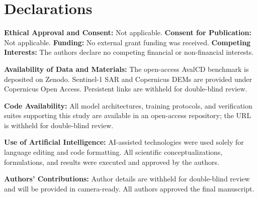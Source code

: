 \section*{Declarations}

\noindent\textbf{Ethical Approval and Consent:} Not applicable. \quad
\textbf{Consent for Publication:} Not applicable. \quad
\textbf{Funding:} No external grant funding was received. \quad
\textbf{Competing Interests:} The authors declare no competing financial or non-financial interests.

\smallskip
\noindent\textbf{Availability of Data and Materials:} The open-access AvalCD benchmark is deposited on Zenodo. Sentinel-1 SAR and Copernicus DEMs are provided under Copernicus Open Access. Persistent links are withheld for double-blind review.

\smallskip
\noindent\textbf{Code Availability:} All model architectures, training protocols, and verification suites supporting this study are available in an open-access repository; the URL is withheld for double-blind review.

\smallskip
\noindent\textbf{Use of Artificial Intelligence:} AI-assisted technologies were used solely for language editing and code formatting. All scientific conceptualizations, formulations, and results were executed and approved by the authors.

\smallskip
\noindent\textbf{Authors' Contributions:} Author details are withheld for double-blind review and will be provided in camera-ready. All authors approved the final manuscript.
